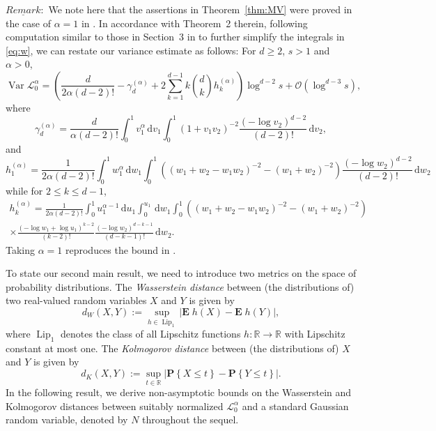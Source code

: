 \documentclass[11pt,reqno]{amsart}
\numberwithin{equation}{section}
\theoremstyle{definition}
\newcommand{\E}{\mathbf{E}}
\newcommand{\R}{\mathbb{R}}
\newcommand{\Prob}[1]{\mathbf P\left\{#1\right\}}
\newcommand{\diff}{{\,\mathrm d}}
\DeclareMathOperator{\Var}{Var}
\begin{document}
\noindent$\underline{Remark}:$ We note here that the assertions in Theorem~\ref{thm:MV} were proved in the case of $\alpha=1$ in \cite{BLP06}. In accordance with Theorem~2 therein, following computation similar to those in Section~3 in \cite{BLP06} to further simplify the integrals in \eqref{eq:w}, we can restate our variance estimate as follows: For $d \ge 2$, $s > 1$ and $\alpha>0$,
\begin{equation*}
	\Var{\mathscr{L}_0^{\alpha}} = \left(\frac{d}{2\alpha (d-2) !}-\gamma_{d}^{(\alpha)} +2 \sum_{k=1}^{d-1} k \binom{d}{k} h_{k}^{(\alpha)}\right) \log^{d-2} s + \mathcal{O}(\log^{d-3} s),
\end{equation*}
where
$$
\gamma_{d}^{(\alpha)}=\frac{d}{\alpha (d-2) !} \int_{0}^{1} v_{1}^\alpha \diff v_{1} \int_{0}^{1}  \left(1+v_{1} v_2\right)^{-2}\frac{\left(-\log v_2\right)^{d-2}}{(d-2) !} \diff v_2,
$$
and
$$
h_{1}^{(\alpha)}=\frac{1}{2\alpha(d-2) !} \int_{0}^{1} w_{1}^\alpha \diff w_{1} \int_{0}^{1}  \left(\left(w_{1}+w_{2}-w_{1} w_{2}\right)^{-2}-\left(w_{1}+w_{2}\right)^{-2}\right)  \frac{\left(-\log w_{2}\right)^{d-2}}{(d-2) !}\diff w_{2}
$$
while for $2 \le k \le d-1$,
\begin{multline*}
	h_{k}^{(\alpha)}=\frac{1}{2\alpha(d-2) !}  \int_{0}^{1} u_1^{\alpha-1}\diff u_{1} \int_{0}^{u_{1}} \diff w_{1} \int_{0}^{1} \left(\left(w_{1}+w_{2}-w_{1} w_{2}\right)^{-2}-\left(w_{1}+w_{2}\right)^{-2}\right) \\
	 \times \frac{\left(-\log w_{1}+\log u_{1}\right)^{k-2}}{(k-2) !} \frac{\left(-\log w_{2}\right)^{d-k-1}}{(d-k-1) !} \diff w_{2}.
\end{multline*}
Taking $\alpha=1$ reproduces the bound in \cite[Theorem~2]{BLP06}.

\vspace{.2cm}


To state our second main result, we need to introduce two metrics on the space of probability distributions. The \textit{Wasserstein distance} between (the distributions of) two real-valued random
variables $X$ and $Y$ is given by
$$
d_W(X,Y):= \sup_{h \in \operatorname{Lip}_1} |\E\; h(X) - \E \; h(Y)|,
$$
where $\operatorname{Lip}_1$ denotes the class of all Lipschitz
functions $h: \R \to \R$ with Lipschitz constant at most one. The
\textit{Kolmogorov distance} between (the distributions of) $X$ and $Y$ is given by
$$
d_K(X,Y):= \sup_{t \in \R} |\Prob{X \le t} - \Prob{Y \le t}|.
$$
In the following result, we derive non-asymptotic bounds on the Wasserstein and Kolmogorov
distances between suitably normalized $\mathscr{L}_0^{\alpha}$
and a standard Gaussian random variable, denoted by $N$ throughout the sequel.
\end{document}
